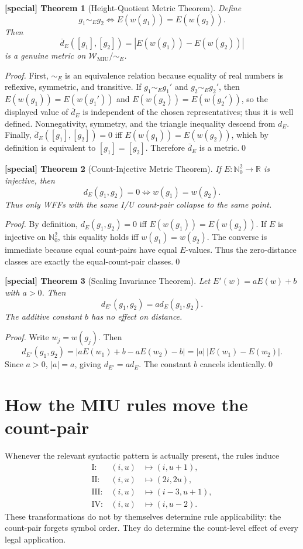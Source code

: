 \documentclass[11pt]{article}
\newtheorem{spthm}{[special] Theorem}
\newcommand{\WMIU}{\mathcal W_{\mathrm{MIU}}}
\newcommand{\dE}{d_E}
\begin{document}
\begin{spthm}[Height-Quotient Metric Theorem]
Define
\[
g_1\sim_E g_2\iff E(w(g_1))=E(w(g_2)).
\]
Then
\[
\bar d_E([g_1],[g_2])=|E(w(g_1))-E(w(g_2))|
\]
is a genuine metric on $\WMIU/\!\sim_E$.
\end{spthm}
\textit{Proof.} First, $\sim_E$ is an equivalence relation because equality of real numbers is reflexive, symmetric, and transitive. If $g_1\sim_E g_1'$ and $g_2\sim_E g_2'$, then $E(w(g_1))=E(w(g_1'))$ and $E(w(g_2))=E(w(g_2'))$, so the displayed value of $\bar d_E$ is independent of the chosen representatives; thus it is well defined. Nonnegativity, symmetry, and the triangle inequality descend from $\dE$. Finally, $\bar d_E([g_1],[g_2])=0$ iff $E(w(g_1))=E(w(g_2))$, which by definition is equivalent to $[g_1]=[g_2]$. Therefore $\bar d_E$ is a metric.\qed


\begin{spthm}[Count-Injective Metric Theorem]
If $E:\mathbb N_0^2\to\mathbb R$ is injective, then
\[
\dE(g_1,g_2)=0\iff w(g_1)=w(g_2).
\]
Thus only WFFs with the same I/U count-pair collapse to the same point.
\end{spthm}
\textit{Proof.} By definition, $\dE(g_1,g_2)=0$ iff $E(w(g_1))=E(w(g_2))$. If $E$ is injective on $\mathbb N_0^2$, this equality holds iff $w(g_1)=w(g_2)$. The converse is immediate because equal count-pairs have equal $E$-values. Thus the zero-distance classes are exactly the equal-count-pair classes.\qed


\begin{spthm}[Scaling Invariance Theorem]
Let $E'(w)=aE(w)+b$ with $a>0$. Then
\[
d_{E'}(g_1,g_2)=a\dE(g_1,g_2).
\]
The additive constant $b$ has no effect on distance.
\end{spthm}
\textit{Proof.} Write $w_j=w(g_j)$. Then
\[
d_{E'}(g_1,g_2)=|aE(w_1)+b-aE(w_2)-b|=|a|\,|E(w_1)-E(w_2)|.
\]
Since $a>0$, $|a|=a$, giving $d_{E'}=a\dE$. The constant $b$ cancels identically.\qed


\section{How the MIU rules move the count-pair}
Whenever the relevant syntactic pattern is actually present, the rules induce
\[
\begin{array}{rcl}
\mathrm{I}:&(i,u)&\mapsto(i,u+1),\\
\mathrm{II}:&(i,u)&\mapsto(2i,2u),\\
\mathrm{III}:&(i,u)&\mapsto(i-3,u+1),\\
\mathrm{IV}:&(i,u)&\mapsto(i,u-2).
\end{array}
\]
These transformations do not by themselves determine rule applicability: the count-pair forgets symbol order. They do determine the count-level effect of every legal application.
\end{document}
